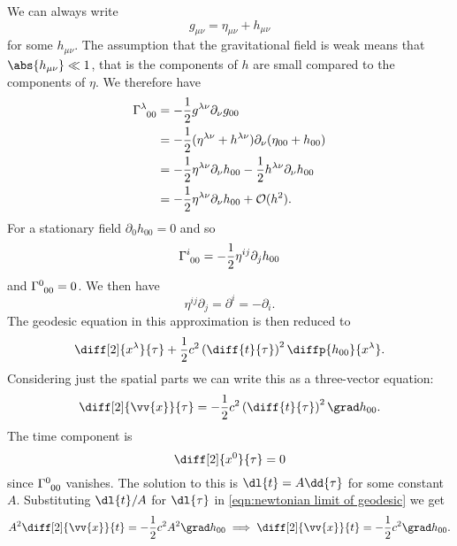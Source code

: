 \documentclass[fleqn]{NotesClass}
\newcommand*{\christoffel}[3]{\tensor{\Gamma}{^{#1}_{{#2}{#3}}}}
\newcommand*{\order}{\mathcal{O}}
\begin{document}
    We can always write
    \begin{equation}
        g_{\mu\nu} = \eta_{\mu\nu} + h_{\mu\nu}
    \end{equation}
    for some \(h_{\mu\nu}\).
    The assumption that the gravitational field is weak means that \(\abs{h_{\mu\nu}} \ll 1\), that is the components of \(h\) are small compared to the components of \(\eta\).
    We therefore have
    \begin{align}
        \christoffel{\lambda}{0}{0} &= -\frac{1}{2}g^{\lambda\nu}\partial_\nu g_{00}\\
        &= -\frac{1}{2}(\eta^{\lambda\nu} + h^{\lambda\nu})\partial_\nu(\eta_{00} + h_{00})\\
        &= -\frac{1}{2} \eta^{\lambda\nu} \partial_\nu h_{00} - \frac{1}{2} h^{\lambda\nu} \partial_\nu h_{00}\\
        &= -\frac{1}{2} \eta^{\lambda\nu} \partial_\nu h_{00} + \order(h^2).
    \end{align}
    For a stationary field \(\partial_0 h_{00} = 0\) and so
    \begin{equation}
        \christoffel{i}{0}{0} = -\frac{1}{2}\eta^{ij}\partial_j h_{00}
    \end{equation}
    and \(\christoffel{0}{0}{0} = 0\).
    We then have
    \begin{equation}
        \eta^{ij}\partial_j = \partial^i = -\partial_i.
    \end{equation}
    The geodesic equation in this approximation is then reduced to
    \begin{equation}
        \diff[2]{x^\lambda}{\tau} + \frac{1}{2} c^2 \left( \diff{t}{\tau} \right)^2 \diffp{h_{00}}{x^\lambda}.
    \end{equation}
    Considering just the spatial parts we can write this as a three-vector equation:
    \begin{equation}\label{eqn:newtonian limit of geodesic}
        \diff[2]{\vv{x}}{\tau} = -\frac{1}{2}c^2 \left( \diff{t}{\tau} \right)^2 \grad h_{00}.
    \end{equation}
    The time component is
    \begin{equation}
        \diff[2]{x^0}{\tau} = 0
    \end{equation}
    since \(\christoffel{0}{0}{0}\) vanishes.
    The solution to this is \(\dl{t} = A\dd{\tau}\) for some constant \(A\).
    Substituting \(\dl{t}/A\) for \(\dl{\tau}\) in \cref{eqn:newtonian limit of geodesic} we get
    \begin{equation}
        A^2\diff[2]{\vv{x}}{t} = -\frac{1}{2}c^2A^2 \grad h_{00} \implies \diff[2]{\vv{x}}{t} = -\frac{1}{2}c^2 \grad h_{00}.
    \end{equation}
    
\end{document}
